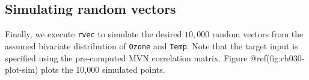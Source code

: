 \documentclass{article}
\newenvironment{Shaded}{\begin{snugshade}}{\end{snugshade}}
\newcommand{\DecValTok}[1]{\textcolor[rgb]{0.00,0.00,0.81}{#1}}
\newcommand{\FunctionTok}[1]{\textcolor[rgb]{0.00,0.00,0.00}{#1}}
\newcommand{\NormalTok}[1]{#1}
\newcommand{\OtherTok}[1]{\textcolor[rgb]{0.56,0.35,0.01}{#1}}
\newcommand{\SpecialCharTok}[1]{\textcolor[rgb]{0.00,0.00,0.00}{#1}}
\begin{document}
\hypertarget{simulating-random-vectors}{%
\subsection{Simulating random vectors}\label{simulating-random-vectors}}

Finally, we execute \texttt{rvec} to simulate the desired \(10,000\)
random vectors from the assumed bivariate distribution of \texttt{Ozone}
and \texttt{Temp}. Note that the target input is specified using the
pre-computed MVN correlation matrix. Figure @ref(fig:ch030-plot-sim)
plots the 10,000 simulated points.

\begin{Shaded}
\end{Shaded}
\end{document}

